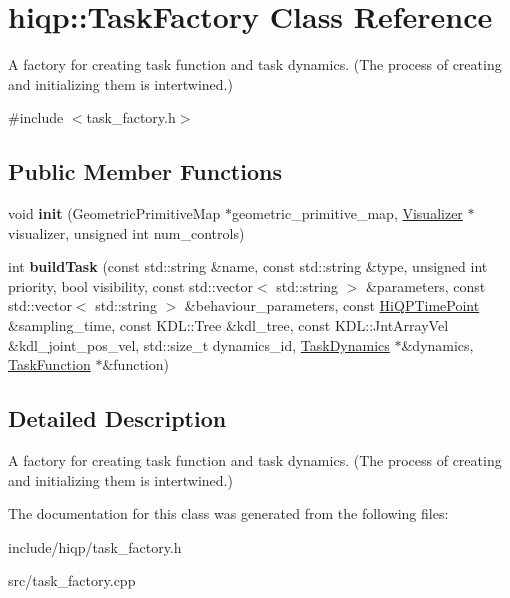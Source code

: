 \hypertarget{classhiqp_1_1TaskFactory}{\section{hiqp\-:\-:Task\-Factory Class Reference}
\label{classhiqp_1_1TaskFactory}
}


A factory for creating task function and task dynamics. (The process of creating and initializing them is intertwined.)  




{\ttfamily \#include $<$task\-\_\-factory.\-h$>$}

\subsection*{Public Member Functions}
\begin{DoxyCompactItemize}
\item 
\hypertarget{classhiqp_1_1TaskFactory_a18b39d326d787327514ec0fc73a155fd}{void {\bfseries init} (Geometric\-Primitive\-Map $\ast$geometric\-\_\-primitive\-\_\-map, \hyperlink{classhiqp_1_1Visualizer}{Visualizer} $\ast$visualizer, unsigned int num\-\_\-controls)}\label{classhiqp_1_1TaskFactory_a18b39d326d787327514ec0fc73a155fd}

\item 
\hypertarget{classhiqp_1_1TaskFactory_a3afab0c3567f34f7407249f6bf3a9b1f}{int {\bfseries build\-Task} (const std\-::string \&name, const std\-::string \&type, unsigned int priority, bool visibility, const std\-::vector$<$ std\-::string $>$ \&parameters, const std\-::vector$<$ std\-::string $>$ \&behaviour\-\_\-parameters, const \hyperlink{classhiqp_1_1HiQPTimePoint}{Hi\-Q\-P\-Time\-Point} \&sampling\-\_\-time, const K\-D\-L\-::\-Tree \&kdl\-\_\-tree, const K\-D\-L\-::\-Jnt\-Array\-Vel \&kdl\-\_\-joint\-\_\-pos\-\_\-vel, std\-::size\-\_\-t dynamics\-\_\-id, \hyperlink{classhiqp_1_1TaskDynamics}{Task\-Dynamics} $\ast$\&dynamics, \hyperlink{classhiqp_1_1TaskFunction}{Task\-Function} $\ast$\&function)}\label{classhiqp_1_1TaskFactory_a3afab0c3567f34f7407249f6bf3a9b1f}

\end{DoxyCompactItemize}


\subsection{Detailed Description}
A factory for creating task function and task dynamics. (The process of creating and initializing them is intertwined.) 

The documentation for this class was generated from the following files\-:\begin{DoxyCompactItemize}
\item 
include/hiqp/task\-\_\-factory.\-h\item 
src/task\-\_\-factory.\-cpp\end{DoxyCompactItemize}
